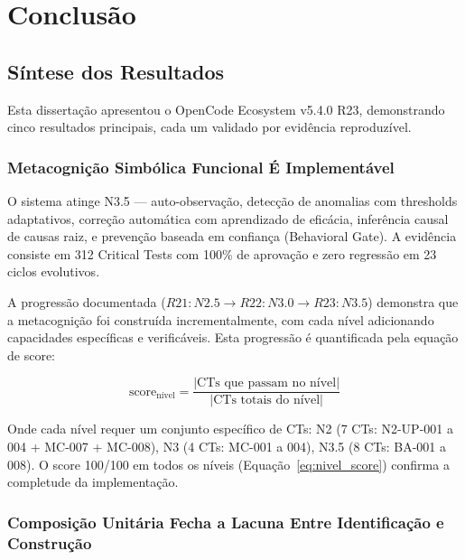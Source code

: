 \chapter{Conclusão}
\label{ch:conclusao}

\section{Síntese dos Resultados}

Esta dissertação apresentou o OpenCode Ecosystem v5.4.0 R23, demonstrando cinco resultados principais, cada um validado por evidência reproduzível.

\subsection{Metacognição Simbólica Funcional É Implementável}

O sistema atinge N3.5 — auto-observação, detecção de anomalias com thresholds adaptativos, correção automática com aprendizado de eficácia, inferência causal de causas raiz, e prevenção baseada em confiança (Behavioral Gate). A evidência consiste em 312 Critical Tests com 100\% de aprovação e zero regressão em 23 ciclos evolutivos.

A progressão documentada ($R21: N2.5 \rightarrow R22: N3.0 \rightarrow R23: N3.5$) demonstra que a metacognição foi construída incrementalmente, com cada nível adicionando capacidades específicas e verificáveis. Esta progressão é quantificada pela equação de score:

\begin{equation}
\text{score}_{\text{nível}} = \frac{|\text{CTs que passam no nível}|}{|\text{CTs totais do nível}|}
\label{eq:nivel_score}
\end{equation}

Onde cada nível requer um conjunto específico de CTs: N2 (7 CTs: N2-UP-001 a 004 + MC-007 + MC-008), N3 (4 CTs: MC-001 a 004), N3.5 (8 CTs: BA-001 a 008). O score 100/100 em todos os níveis (Equação~\ref{eq:nivel_score}) confirma a completude da implementação.

\subsection{Composição Unitária Fecha a Lacuna Entre Identificação e Construção}

